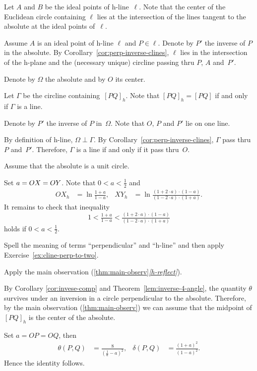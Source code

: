 Let $A$ and $B$ be the ideal points of h-line~$\ell$. 
Note that the center of the Euclidean circle containing $\ell$ lies 
at the intersection of the lines tangent to the absolute at the ideal points of~$\ell$.

Assume $A$ is an ideal point of h-line $\ell$
and $P\in \ell$.
Denote by $P'$ the inverse of $P$ in the absolute.
By Corollary~\ref{cor:perp-inverse-clines},
$\ell$ lies in the intersection of the h-plane and the (necessary unique) circline 
passing thru $P$, $A$ and~$P'$.

Denote by $\Omega$ the absolute and by $O$ its center. 

Let $\Gamma$ be the circline containing~$[PQ]_h$.
Note that $[PQ]_h=[PQ]$ if and only if $\Gamma$ is a line.

Denote by $P'$ the inverse of $P$ in~$\Omega$.
Note that $O$, $P$ and $P'$ lie on one line.

By definition of h-line, $\Omega\perp \Gamma$.
By Corollary~\ref{cor:perp-inverse-clines}, $\Gamma$ pass thru $P$ and~$P'$. 
Therefore, $\Gamma$
is a line if and only if it pass thru~$O$.


Assume that the absolute is a unit circle.

Set $a\z=OX\z=OY$.
Note that $0<a<\tfrac12$ and
\begin{align*}
OX_h&=\ln \tfrac{1+a}{1-a},
&
XY_h&=\ln \tfrac{(1+2\cdot a)\cdot(1-a)}{(1-2\cdot a)\cdot(1+a)}.
\end{align*}
It remains to check that inequality 
\[1<
\tfrac{1+a}{1-a}
<
\tfrac{(1+2\cdot a)\cdot(1-a)}{(1-2\cdot a)\cdot(1+a)}\]
holds if $0<a<\tfrac12$.

Spell the meaning of terms ``perpendicular'' and ``h-line'' and then apply Exercise~\ref{ex:cline-perp-to-two}.

Apply the main observation (\ref{thm:main-observ}\textit{\ref{h-reflect}}).

By Corollary \ref{cor:invese-comp} and Theorem~\ref{lem:inverse-4-angle},
the quantity $\theta$ survives under an inversion in a circle perpendicular to the absolute.
Therefore, by the main observation (\ref{thm:main-observ})
we can assume that the midpoint of $[PQ]_h$ is the center of the absolute.

Set $a=OP=OQ$, then 
\begin{align*}
\theta(P,Q)&=\frac{8}{(\tfrac1a-a)^2},
&
\delta(P,Q)&=\frac{(1+a)^2}{(1-a)^2}.
\end{align*}
Hence the identity follows.

